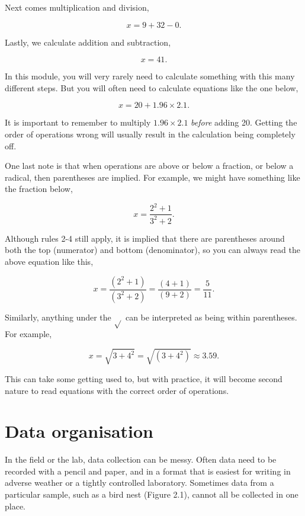 \documentclass[
]{scrbook}
\begin{document}
Next comes multiplication and division,

\[x = 9 + 32 -  0.\]

Lastly, we calculate addition and subtraction,

\[x = 41.\]

In this module, you will very rarely need to calculate something with this many different steps.
But you will often need to calculate equations like the one below,

\[x = 20 + 1.96 \times 2.1.\]

It is important to remember to multiply \(1.96 \times 2.1\) \emph{before} adding 20.
Getting the order of operations wrong will usually result in the calculation being completely off.

One last note is that when operations are above or below a fraction, or below a radical, then parentheses are implied.
For example, we might have something like the fraction below,

\[x = \frac{2^{2} + 1}{3^{2} +2}.\]

Although rules 2-4 still apply, it is implied that there are parentheses around both the top (numerator) and bottom (denominator), so you can always read the above equation like this,

\[x = \frac{\left(2^{2} + 1\right)}{\left(3^{2} + 2\right)} = \frac{\left(4 + 1\right)}{\left(9 + 2\right)} = \frac{5}{11}.\]

Similarly, anything under the \(\sqrt{}\) can be interpreted as being within parentheses.
For example,

\[x = \sqrt{3 + 4^{2}} = \sqrt{\left(3 + 4^{2} \right)} \approx 3.59.\]

This can take some getting used to, but with practice, it will become second nature to read equations with the correct order of operations.

\hypertarget{Chapter_2}{%
\chapter{Data organisation}\label{Chapter_2}}

In the field or the lab, data collection can be messy.
Often data need to be recorded with a pencil and paper, and in a format that is easiest for writing in adverse weather or a tightly controlled laboratory.
Sometimes data from a particular sample, such as a bird nest (Figure 2.1), cannot all be collected in one place.
\end{document}
